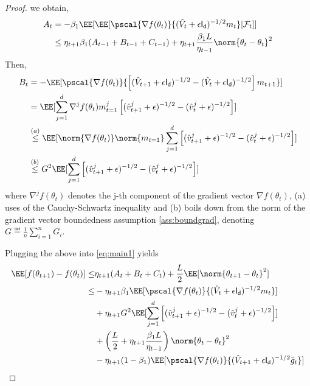 \documentclass[11pt]{article}
\begin{document}
\begin{proof}
we obtain,
\begin{align}
A_t & = - \beta_1\EE[\EE[\pscal{\nabla f(\theta_t)}{(\hat{V}_{t} + \epsilon \mathsf{I_d})^{-1/2} m_{t}}| \mathcal{F}_t]]\\
&  \leq \eta_{t+1} \beta_1(A_{t-1} + B_{t-1} + C_{t-1})  + \eta_{t+1}\frac{\beta_1 L}{\eta_{t-1}} \norm{\theta_t - \theta_{t}}^2
\end{align}
Then,
\begin{align}
B_t & =-  \EE[\pscal{\nabla f(\theta_t)}{\left[(\hat{V}_{t+1} + \epsilon \mathsf{I_d})^{-1/2} - (\hat{V}_{t} + \epsilon \mathsf{I_d})^{-1/2}  \right]m_{t+1}}]\\
& =  \EE[\sum_{j=1}^d  \nabla^j f(\theta_t)m_{t=1}^j \left[(\hat{v}^j_{t+1} + \epsilon )^{-1/2} - (\hat{v}^j_{t} + \epsilon )^{-1/2}  \right] ]\\
& \overset{(a)}{\leq}  \EE[\norm{\nabla f(\theta_t)} \norm{m_{t=1}}\sum_{j=1}^d\left[(\hat{v}^j_{t+1} + \epsilon )^{-1/2} - (\hat{v}^j_{t} + \epsilon )^{-1/2}  \right] ]\\
& \overset{(b)}{\leq}  G^2 \EE[\sum_{j=1}^d \left[(\hat{v}^j_{t+1} + \epsilon )^{-1/2} - (\hat{v}^j_{t} + \epsilon )^{-1/2}  \right] ]
\end{align}
where $\nabla^j f(\theta_t)$ denotes the j-th component of the gradient vector $\nabla f(\theta_t)$, (a) uses of the Cauchy-Schwartz inequality and (b) boils down from the norm of the gradient vector boundedness assumption \ref{ass:boundgrad}, denoting $G \eqdef \frac{1}{n}\sum_{i=1}^n G_i$.


Plugging the above into \eqref{eq:main1} yields
\begin{equation}
\begin{split}
\EE[f(\theta_{t+1}) - f(\theta_{t}) ] \leq & \eta_{t+1}(A_t + B_t + C_t) + \frac{L}{2} \EE[\norm{\theta_{t+1} - \theta_{t}}^2]\\
 \leq &- \eta_{t+1} \beta_1\EE[\pscal{\nabla f(\theta_t)}{(\hat{V}_{t} + \epsilon \mathsf{I_d})^{-1/2} m_{t}}]\\
&+   \eta_{t+1} G^2 \EE[\sum_{j=1}^d \left[(\hat{v}^j_{t+1} + \epsilon )^{-1/2} - (\hat{v}^j_{t} + \epsilon )^{-1/2}  \right] ]\\
&+  \left(\frac{L}{2} + \eta_{t+1}\frac{\beta_1 L}{\eta_{t-1}} \right) \norm{\theta_t - \theta_{t}}^2\\
&-   \eta_{t+1}(1-\beta_1) \EE[\pscal{\nabla f(\theta_t)}{(\hat{V}_{t+1} + \epsilon \mathsf{I_d})^{-1/2} \bar{g}_t}]
\end{split}
\end{equation}


\end{proof}
\end{document}
